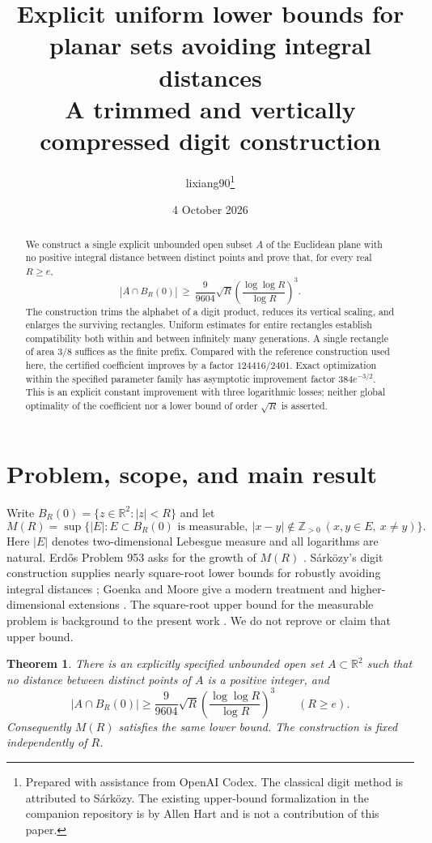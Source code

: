 \documentclass[11pt,a4paper]{article}
\title{Explicit uniform lower bounds for planar sets avoiding integral distances\\
\large A trimmed and vertically compressed digit construction}
\author{lixiang90\thanks{Prepared with assistance from OpenAI Codex. The classical
digit method is attributed to S\'ark\"ozy. The existing upper-bound formalization
in the companion repository is by Allen Hart and is not a contribution of this paper.}}
\date{4 October 2026}
\newtheorem{theorem}{Theorem}[section]
\theoremstyle{remark}\newtheorem{remark}[theorem]{Remark}
\newcommand{\R}{\mathbb R}
\newcommand{\Z}{\mathbb Z}
\newcommand{\PhiR}{\sqrt R\left(\frac{\log\log R}{\log R}\right)^3}
\begin{document}
\maketitle
\begin{abstract}
We construct a single explicit unbounded open subset $A$ of the Euclidean plane
with no positive integral distance between distinct points and prove that, for
every real $R\ge e$,
\[
 |A\cap B_R(0)|\ \ge\ \frac9{9604}\sqrt R
       \left(\frac{\log\log R}{\log R}\right)^3.
\]
The construction trims the alphabet of a digit product, reduces its vertical
scaling, and enlarges the surviving rectangles. Uniform estimates for entire
rectangles establish compatibility both within and between infinitely many
generations. A single rectangle of area $3/8$ suffices as the finite prefix.
Compared with the reference construction used here, the certified coefficient
improves by a factor $124416/2401$. Exact optimization within the specified
parameter family has asymptotic improvement factor $384e^{-3/2}$.
This is an explicit constant improvement with three logarithmic losses;
neither global optimality of the coefficient nor a lower bound of order
$\sqrt R$ is asserted.
\end{abstract}

\section{Problem, scope, and main result}
Write $B_R(0)=\{z\in\R^2:|z|<R\}$ and let
\[
 M(R)=\sup\{|E|:E\subset B_R(0)\text{ is measurable},\
       |x-y|\notin\Z_{>0}\ (x,y\in E,\ x\ne y)\}.
\]
Here $|E|$ denotes two-dimensional Lebesgue measure and all logarithms are
natural. Erd\H{o}s Problem 953 asks for the growth of $M(R)$ \cite{bloom}.
S\'ark\"ozy's digit construction supplies nearly square-root lower bounds
for robustly avoiding integral distances \cite{sarkozy1,sarkozy2};
Goenka and Moore give a modern treatment and higher-dimensional extensions
\cite{gm}. The square-root upper bound for the measurable problem is background
to the present work \cite{ulam}. We do not reprove or claim that upper bound.

\begin{theorem}\label{thm:main}
There is an explicitly specified unbounded open set $A\subset\R^2$ such that
no distance between distinct points of $A$ is a positive integer, and
\begin{equation}\label{eq:main}
 |A\cap B_R(0)|\ge\frac9{9604}\PhiR\qquad(R\ge e).
\end{equation}
Consequently $M(R)$ satisfies the same lower bound. The construction is fixed
independently of $R$.
\end{theorem}
\end{document}
